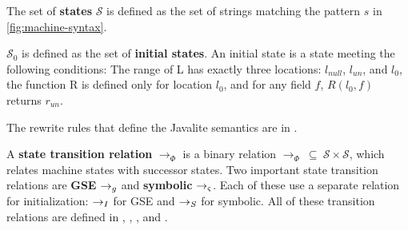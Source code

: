 \begin{definition}
\label{def:state}
The set of \textbf{states} $\mathcal{S}$ is defined as the set of strings matching the pattern $s$ in \ref{fig:machine-syntax}.
\end{definition}

\begin{definition}
\label{def:initstate}
$\mathcal{S}_0$ is defined as the set of \textbf{initial states}. An initial state is a state meeting the following conditions:  The range of L has exactly three locations: $l_{null}$, $l_{un}$, and $l_0$, the function R is defined only for location $l_0$, and for any field $f$, $R(l_0,f)$ returns $r_{un}$. 
\end{definition}



The rewrite rules that define the Javalite semantics are in
.


\begin{definition}
A \textbf{state transition relation} $\rightarrow_{\Phi}$ is a binary relation $\rightarrow_{\Phi}\ \subseteq\ \mathcal{S} \times \mathcal{S} $, which relates machine states with successor states. Two important state transition relations are \textbf{GSE} $\rightarrow_{g}$ and \textbf{symbolic} $\rightarrow_{\varsigma}$. Each of these use a separate relation for initialization: $\rightarrow_I$ for GSE and $\rightarrow_S$ for symbolic. All of these transition relations are defined in , , , and .
\end{definition}

